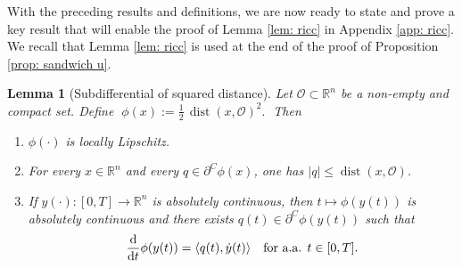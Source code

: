 \documentclass[12pt]{amsart}
\newcommand{\D}[1]{\mbox{\rm #1}}
\newcommand{\dd}{\D{d}}
\numberwithin{equation}{section}
\theoremstyle{plain}
\newtheorem{lemma}[theorem]{Lemma}
\begin{document}
With the preceding results and definitions, we are now ready to state and prove a key result that will enable the proof of Lemma \ref{lem: ricc} in Appendix \ref{app: ricc}. We recall that Lemma \ref{lem: ricc} is used at the end of the proof of Proposition \ref{prop: sandwich u}.

\begin{lemma}[Subdifferential of squared distance]\label{lem:geom}
Let $\mathscr{O}\subset\mathbb{R}^{n}$ be a non-empty and compact set. Define $\; \phi(x):=\frac{1}{2}\,\operatorname{dist}(x,\mathscr{O})^2.\;$ Then
\begin{enumerate}[label = (\roman*)]
\item\label{first in lemma} $\phi(\cdot)$ is locally Lipschitz.
\item\label{second in lemma} For every $x\in\mathbb{R}^{n}$ and every $q\in\partial^C\phi(x)$, one has 
 $|q|\leq \operatorname{dist}(x,\mathscr{O})$.
\item\label{third in lemma} If $y(\cdot):[0,T]\to\mathbb{R}^{n}$ is absolutely continuous, then $t\mapsto\phi(y(t))$ is absolutely continuous and there exists   $q(t)\in\partial^C\phi(y(t))$ such that
\begin{equation*}
    \frac{\dd}{\dd t}\phi(y(t))=\langle q(t),\dot y(t)\rangle\quad\text{for a.a. } t\in[0,T].
\end{equation*}
\end{enumerate}
\end{lemma}
\end{document}
